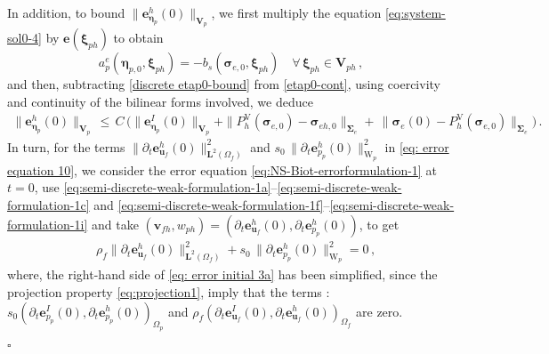 \documentclass[11pt]{article}
\numberwithin{equation}{section}
\newcommand{\bbeta}{{\boldsymbol\eta}}
\newcommand{\bsi}{{\boldsymbol\sigma}}
\newcommand{\bSigma}{{\boldsymbol\Sigma}}
\newcommand{\bxi}{{\boldsymbol\xi}}
\newcommand{\bv}{{\mathbf{v}}}
\newcommand{\bu}{\mathbf{u}}
\newcommand{\be}{{\mathbf{e}}}
\newcommand{\0}{{\mathbf{0}}}
\def\bV{\mathbf{V}}
\newcommand{\bL}{\mathbf{L}}
\def\V{\mathrm{V}}
\def\W{\mathrm{W}}
\newenvironment{proof}{\noindent{\it Proof.}}{\hfill$\square$}
\numberwithin{equation}{section}
\begin{document}
\begin{proof}
%
In addition, to bound $\|\be_{\bbeta_p}^h(0)\|_{\bV_p}$, we first multiply the equation \eqref{eq:system-sol0-4} by $\be(\bxi_{ph})$ to obtain
\begin{equation}\label{etap0-cont}
a^e_p(\bbeta_{p,0},\bxi_{ph}) 
= - b_s(\bsi_{e,0},\bxi_{ph})\quad \forall\,\bxi_{ph} \in \bV_{ph} \,,
\end{equation}
and then, subtracting \eqref{discrete etap0-bound} from \eqref{etap0-cont}, using coercivity and continuity of the bilinear forms involved, we deduce
%
\begin{align}\label{eq: error initial 2b}
\|\be^h_{\bbeta_p}(0)\|_{\bV_p} \,\leq\, C\,\Big( \|\be^I_{\bbeta_p}(0)\|_{\bV_p} + \|P_h^{\V}(\bsi_{e,0})-\bsi_{eh,0}\|_{\bSigma_{e}} + \, \|\bsi_{e}(0) - P_h^{\V}(\bsi_{e,0})\|_{\bSigma_{e}} \Big)\,.
\end{align}
%
In turn, for the terms $\|\partial_t\be_{\bu_f}^h(0)\|^2_{\bL^2(\Omega_f)}$ and 
$s_0\,\|\partial_t\be_{p_p}^h(0)\|^2_{\W_p}$ in \eqref{eq: error equation 10}, we consider the error equation \eqref{eq:NS-Biot-errorformulation-1} at $t=0$, 
use \eqref{eq:semi-discrete-weak-formulation-1a}--\eqref{eq:semi-discrete-weak-formulation-1c} and \eqref{eq:semi-discrete-weak-formulation-1f}--\eqref{eq:semi-discrete-weak-formulation-1i} and take $(\bv_{fh}, w_{ph}) = (\partial_t\be_{\bu_f}^h(0), \partial_t\be_{p_p}^h(0))$, to get
%
\begin{align}\label{eq: error initial 3a}
&\rho_f\|\partial_t\be_{\bu_f}^h(0)\|^2_{\bL^2(\Omega_f)} 
+ s_0\,\|\partial_t\be_{p_p}^h(0)\|^2_{\W_p}  = 0 \,,
\end{align}
%
where, the right-hand side of \eqref{eq: error initial 3a} has been simplified, since the projection property \eqref{eq:projection1}, 
imply that the terms :
$s_0 (\partial_t\be_{p_p}^I(0),\partial_t\be_{p_p}^h(0))_{\Omega_p}$ and $\rho_f (\partial_t\be_{\bu_f}^I(0),\partial_t\be_{\bu_f}^h(0))_{\Omega_f}$ are zero.



\end{proof}
\end{document}

